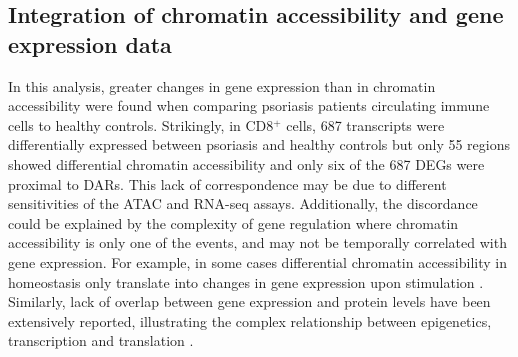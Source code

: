 



\subsection{Integration of chromatin accessibility and gene expression data}
In this analysis, greater changes in gene expression than in chromatin accessibility were found when comparing psoriasis patients circulating immune cells to healthy controls. Strikingly, in CD8$^+$ cells, 687 transcripts were differentially expressed between psoriasis and healthy controls but only 55 regions showed differential chromatin accessibility and only six of the 687 DEGs were proximal to DARs. This lack of correspondence may be due to different sensitivities of the ATAC and RNA-seq assays. Additionally, the discordance could be explained by the complexity of gene regulation where chromatin accessibility is only one of the events, and may not be temporally correlated with gene expression. For example, in some cases differential chromatin accessibility in homeostasis only translate into changes in gene expression upon stimulation \parencite{Alasoo2018,Calderon2018}. Similarly, lack of overlap between gene expression and protein levels have been extensively reported, illustrating the complex relationship between epigenetics, transcription and translation \parencite{Liu2016}. 




